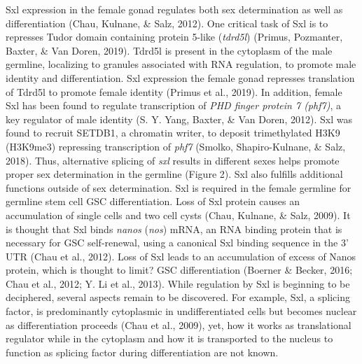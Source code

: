 \documentclass[12pt,oneside]{reedthesis}
\begin{document}
Sxl expression in the female gonad regulates both sex determination as
well as differentiation (Chau, Kulnane, \& Salz, 2012). One critical task of Sxl is to
represses Tudor domain containing protein 5-like (\emph{tdrd5l})
(Primus, Pozmanter, Baxter, \& Van Doren, 2019). Tdrd5l is present in the cytoplasm of the male
germline, localizing to granules associated with RNA regulation, to
promote male identity and differentiation. Sxl expression the female
gonad represses translation of Tdrd5l to promote female identity
(Primus et al., 2019). In addition, female Sxl has been found to regulate
transcription of \emph{PHD finger protein 7 (phf7)}, a key regulator of male
identity (S. Y. Yang, Baxter, \& Van Doren, 2012). Sxl was found to recruit SETDB1, a chromatin
writer, to deposit trimethylated H3K9 (H3K9me3) repressing transcription
of \emph{phf7} (Smolko, Shapiro-Kulnane, \& Salz, 2018). Thus, alternative splicing of \emph{sxl} results
in different sexes helps promote proper sex determination in the
germline (Figure 2). Sxl also fulfills additional functions outside of
sex determination. Sxl is required in the female germline for germline
stem cell GSC differentiation. Loss of Sxl protein causes an
accumulation of single cells and two cell cysts (Chau, Kulnane, \& Salz, 2009). It is
thought that Sxl binds \emph{nanos} (\emph{nos}) mRNA, an RNA binding protein that
is necessary for GSC self-renewal, using a canonical Sxl binding
sequence in the 3' UTR (Chau et al., 2012). Loss of Sxl leads to an
accumulation of excess of Nanos protein, which is thought to limit? GSC
differentiation (Boerner \& Becker, 2016; Chau et al., 2012; Y. Li et al., 2013). While
regulation by Sxl is beginning to be deciphered, several aspects remain
to be discovered. For example, Sxl, a splicing factor, is predominantly
cytoplasmic in undifferentiated cells but becomes nuclear as
differentiation proceeds (Chau et al., 2009), yet, how it works as
translational regulator while in the cytoplasm and how it is transported
to the nucleus to function as splicing factor during differentiation are
not known.
\end{document}
